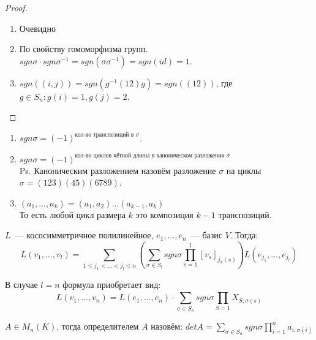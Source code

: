 \begin{proof}\leavevmode
    \begin{enumerate}
        \item Очевидно
        \item По свойству гомоморфизма групп.
            $sgn\sigma\cdot sgn\sigma^{-1} = sgn(\sigma\sigma^{-1}) = sgn(id) = 1$.
        \item
        $sgn\left((i,j)\right) = sgn\left(g^{-1}(12)g\right) = sgn\left((12)\right)$, где $g\in S_n\colon g(i) = 1, g(j) = 2$. 

    \end{enumerate}
\end{proof}
\begin{follow}\leavevmode
    \begin{enumerate}
        \item
            $sgn\sigma = (-1)^{\text{кол-во транспозиций в $\sigma$}}$.
        \item
            $sgn\sigma = (-1)^{\text{кол-во циклов чётной длины в каноническом разложении $\sigma$}}$\\
            Ps. Каноническим разложением назовём разложение $\sigma$ на циклы 
            $\sigma =(123)(45)(6789)$.
        \item
            $(a_1,\dots, a_k) = (a_1,a_2)\dots(a_{k-1},a_k)$\\
            То есть любой цикл размера $k$ это композиция $k-1$ транспозиций.
    \end{enumerate}
\end{follow}
\begin{statement}
    $L$~--- кососимметричное полилинейное, $e_1,\dots,e_n$~--- базис $V$. Тогда:
    \[
        L(v_1,\dots, v_l) = \sum\limits_{1\le j_1<\dots<j_l\le n}{
    \left(\sum\limits_{\sigma\in S_l}{sgn\sigma \prod\limits_{s=1}^{l}{[v_s]_{j_\sigma(s)}}}\right)L(e_{j_1},\dots,e_{j_l})
        }
    \]
\end{statement}
\begin{remark}
    В случае $l = n$ формула приобретает вид:
    \[
        L(v_1,\dots, v_n) = L(e_1,\dots, e_n)\cdot \sum\limits_{\sigma\in S_n}^{}{
            sgn\sigma\prod_{S = 1}{X_{S,\sigma(s)}}
        }
    \]
\end{remark}
\begin{definition}
    $A\in M_n(K)$, тогда определителем $A$ назовём: $detA = \sum\limits_{\sigma\in S_n}
    {sgn\sigma \prod\limits_{i = 1}^{n}{a_{i, \sigma(i)}}}$
\end{definition}
